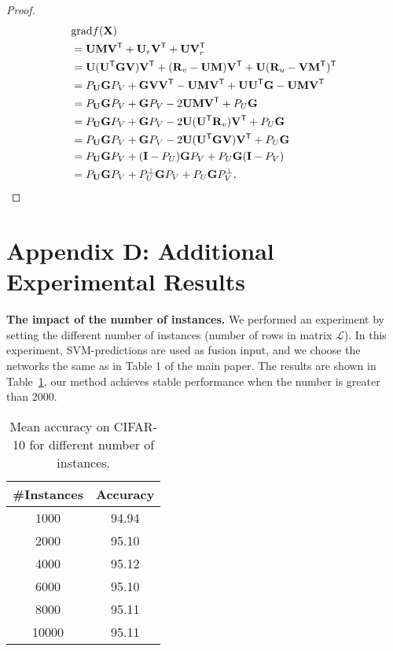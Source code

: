 \documentclass[letterpaper]{article} %
\def\symp{r}
\def\bR{{\bf R}}
\def\U{{\bf U}}
\def\V{{\bf V}}
\def\trsp{{\sf T}}
\def\G{{\bf G}}
\def\grad{{\text{grad}}}
\def\bM{{\bf M}}
\def\bI{{\bf I}}
\def\calL{{\mathcal{L}}}
\def\bX{{\bf X}}
\def\bI{{\bf I}}
\def\bX{{\bf X}}
\begin{document}
\begin{proof}
\begin{align}
\label{eq:proof_lemma1}
       & \grad f(\bX) \\
       & = \U \bM \V^{\trsp} + \U_{\symp} \V^{\trsp} + \U \V_{\symp}^{\trsp}  \nonumber \\
       & = \U(\U^{\trsp} \G \V) \V^{\trsp} + (\bR_{v} - \U \bM) \V^{\trsp} + \U (\bR_{u} - \V \bM^{\trsp})^{\trsp} \nonumber \\
       & = P_{\U} \G P_{V} + \G \V \V^{\trsp} - \U \bM \V^{\trsp} + \U \U^{\trsp} \G - \U \bM \V^{\trsp} \nonumber \\
       & = P_{\U} \G P_{V} + \G P_{V} - 2\U \bM \V^{\trsp} + P_{U} \G  \nonumber \\
       & = P_{\U} \G P_{V} + \G P_{V} - 2\U (\U^{\trsp} \bR_{v}) \V^{\trsp} + P_{U} \G  \nonumber \\
       & = P_{\U} \G P_{V} + \G P_{V} - 2\U (\U^{\trsp} \G \V) \V^{\trsp} + P_{U} \G  \nonumber \\
       & = P_{\U} \G P_{V} + (\bI - P_{U}) \G P_{V} + P_{U} \G (\bI - P_{V})  \nonumber \\
       & = P_{\U} \G P_{V} + P_{U}^{\perp} \G P_{V} + P_{U} \G P_{V}^{\perp}  ,
\end{align}
\end{proof}

\section{Appendix D: Additional Experimental Results}
{\bf{The impact of the number of instances.}}
We performed an experiment by setting the different number of instances (number of rows in matrix $\calL$). 
In this experiment, SVM-predictions are used as fusion input, and we choose the networks the same as in Table 1 of the main paper.
The results are shown in Table~\ref{table:number}, our method achieves stable performance when the number is greater than 2000.

\begin{table}[ht]
\centering
\begin{tabular}{|c|c|}\hline
\#Instances &   Accuracy      \\\hline
1000       &   94.94          \\\hline
2000       &   95.10          \\\hline
4000       &   95.12          \\\hline
6000       &   95.10          \\\hline
8000       &   95.11          \\\hline
10000      &   95.11          \\\hline
\end{tabular}
\caption{Mean accuracy on CIFAR-10 for different number of instances.
}
\label{table:number}
\end{table}
\end{document}
